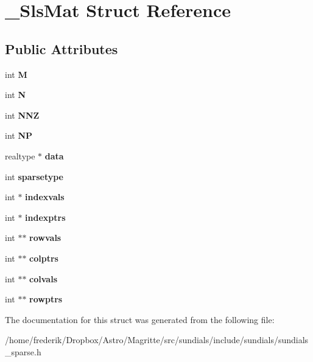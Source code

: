 \hypertarget{struct__SlsMat}{}\section{\+\_\+\+Sls\+Mat Struct Reference}
\label{struct__SlsMat}
\subsection*{Public Attributes}
\begin{DoxyCompactItemize}
\item 
\mbox{\label{struct__SlsMat_a3a6a11160b535e6a7a8ff6daeac1d2dd}} 
int {\bfseries M}
\item 
\mbox{\label{struct__SlsMat_a6d9e27954ff1fc9511284bb9a725c669}} 
int {\bfseries N}
\item 
\mbox{\label{struct__SlsMat_aceae12ffa483dbf6d901a739ed6c47f8}} 
int {\bfseries N\+NZ}
\item 
\mbox{\label{struct__SlsMat_a4ea352915097a9c8b6eaabb50b9c1ba0}} 
int {\bfseries NP}
\item 
\mbox{\label{struct__SlsMat_a098773913e74fdc9a6712ca33c03f251}} 
realtype $\ast$ {\bfseries data}
\item 
\mbox{\label{struct__SlsMat_a4be73bf22928c090683c38cff6613bae}} 
int {\bfseries sparsetype}
\item 
\mbox{\label{struct__SlsMat_ae72d8b38009de3f9f714ecc909301d3d}} 
int $\ast$ {\bfseries indexvals}
\item 
\mbox{\label{struct__SlsMat_a76c7392786cf1e854558e211a438bd99}} 
int $\ast$ {\bfseries indexptrs}
\item 
\mbox{\label{struct__SlsMat_af207ec1d1744c4a295b08db4831fad92}} 
int $\ast$$\ast$ {\bfseries rowvals}
\item 
\mbox{\label{struct__SlsMat_ab90b9aaa001bf7c9c1a941b287854711}} 
int $\ast$$\ast$ {\bfseries colptrs}
\item 
\mbox{\label{struct__SlsMat_a4754f7c7b865d5283f608e17f5f32d15}} 
int $\ast$$\ast$ {\bfseries colvals}
\item 
\mbox{\label{struct__SlsMat_a5008c97f7bbaaffb013c1630d3aaa07b}} 
int $\ast$$\ast$ {\bfseries rowptrs}
\end{DoxyCompactItemize}


The documentation for this struct was generated from the following file\+:\begin{DoxyCompactItemize}
\item 
/home/frederik/\+Dropbox/\+Astro/\+Magritte/src/sundials/include/sundials/sundials\+\_\+sparse.\+h\end{DoxyCompactItemize}
